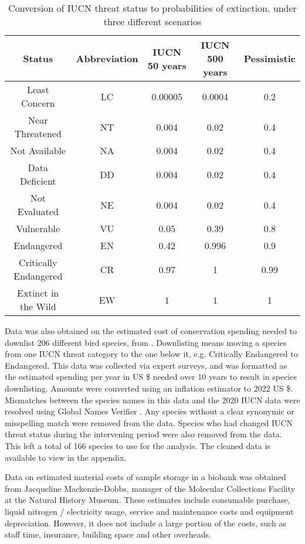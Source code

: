 \documentclass[10pt]{article}
\begin{document}
	\begin{table}[b]
		\begin{tabular}{|c|c c c c|}
			\hline
			Status & Abbreviation & IUCN 50 years & IUCN 500 years & Pessimistic \\
			\hline
			Least Concern & LC & 0.00005 & 0.0004 & 0.2 \\
			Near Threatened & NT & 0.004 & 0.02 & 0.4 \\
			Not Available & NA & 0.004 & 0.02 & 0.4 \\
			Data Deficient & DD & 0.004 & 0.02 & 0.4 \\
			Not Evaluated & NE & 0.004 & 0.02 & 0.4 \\
			Vulnerable & VU & 0.05 & 0.39 & 0.8 \\
			Endangered & EN & 0.42 & 0.996 & 0.9 \\
			Critically Endangered & CR & 0.97 & 1 & 0.99 \\
			Extinct in the Wild & EW & 1 & 1 & 1 \\
			\hline
		\end{tabular}
		\caption{Conversion of IUCN threat status to probabilities of extinction, under three
			different scenarios \cite{mooersConvertingEndangeredSpecies2008}}\label{ext_prob}
	\end{table}

	Data was also obtained on the estimated cost of conservation spending needed to downlist 206 different bird species, from \cite[McCarthy \textit{et al.} 2012]{mccarthyFinancialCostsMeeting2012}. Downlisting means moving a species from one IUCN threat category to the one below it, e.g. Critically Endangered to Endangered. This data was collected via expert surveys, and was formatted as the estimated spending per year in US \$ needed over 10 years to result in species downlisting. Amounts were converted using an inflation estimator to 2022 US \$. Mismatches between the species names in this data and the 2020 IUCN data were resolved using Global Names Verifier \cite{}. Any species without a clear synonymic or misspelling match were removed from the data. Species who had changed IUCN threat status during the intervening period were also removed from the data. This left a total of 166 species to use for the analysis. The cleaned data is available to view in the appendix.
	
	Data on estimated material costs of sample storage in a biobank was obtained from Jacqueline Mackenzie-Dobbs, manager of the Molecular Collections Facility at the Natural History Museum. These estimates include consumable purchase, liquid nitrogen / electricity usage, service and maintenance costs and equipment depreciation. However, it does not include a large portion of the costs, such as staff time, insurance, building space and other overheads.
	
\end{document}
